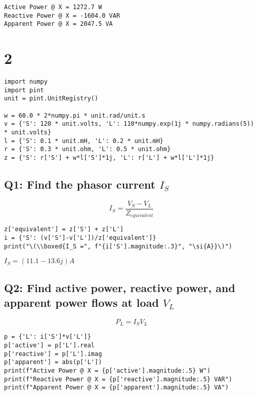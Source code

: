 \documentclass[11pt]{article}
\begin{document}
\begin{verbatim}
Active Power @ X = 1272.7 W
Reactive Power @ X = -1604.0 VAR
Apparent Power @ X = 2047.5 VA
\end{verbatim}

\section*{2}
\label{sec:org745b923}
\begin{verbatim}
import numpy
import pint
unit = pint.UnitRegistry()

w = 60.0 * 2*numpy.pi * unit.rad/unit.s
v = {'S': 120 * unit.volts, 'L': 110*numpy.exp(1j * numpy.radians(5)) * unit.volts}
l = {'S': 0.1 * unit.mH, 'L': 0.2 * unit.mH}
r = {'S': 0.3 * unit.ohm, 'L': 0.5 * unit.ohm}
z = {'S': r['S'] + w*l['S']*1j, 'L': r['L'] + w*l['L']*1j}
\end{verbatim}

\subsection*{Q1: Find the phasor current \(I_S\)}
\label{sec:orga1d49e2}
\begin{equation*}
  I_S = \frac{V_S - V_L}{Z_{equivalent}}
\end{equation*}
\begin{verbatim}
z['equivalent'] = z['S'] + z['L']
i = {'S': (v['S']-v['L'])/z['equivalent']}
print("\(\\boxed{I_S =", f"{i['S'].magnitude:.3}", "\si{A}}\)")
\end{verbatim}
\(\boxed{I_S = (11.1-13.6j) \si{A}}\)

\subsection*{Q2: Find active power, reactive power, and apparent power flows at load \(V_L\)}
\label{sec:orgc4eada7}
\begin{equation*}
  P_L = I_SV_L
\end{equation*}
\begin{verbatim}
p = {'L': i['S']*v['L']}
p['active'] = p['L'].real
p['reactive'] = p['L'].imag
p['apparent'] = abs(p['L'])
print(f"Active Power @ X = {p['active'].magnitude:.5} W")
print(f"Reactive Power @ X = {p['reactive'].magnitude:.5} VAR")
print(f"Apparent Power @ X = {p['apparent'].magnitude:.5} VA")
\end{verbatim}
\end{document}
